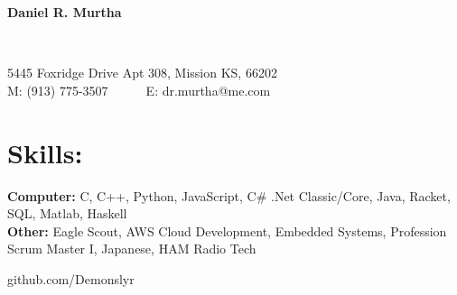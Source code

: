 \documentclass{res}
\begin{document}
\begin{resume}
\begin{changemargin}{-0.5in}{0in}
	\begin{center}
		\begin{Huge}
		\textbf{Daniel R. Murtha}
		\end{Huge}
	\\
		\begin{normalsize}
			5445 Foxridge Drive Apt 308, Mission KS, 66202\\
			M: (913) 775-3507~~~~~~E: dr.murtha@me.com
		\end{normalsize}
	\end{center}
\end{changemargin}\vspace{-5pt}
 \section{Skills:}\vspace{-10pt}
 \begin{minipage}{0.8\linewidth}
 	\begin{small}
 		\begin{flushleft}
 			{\bf Computer: }C, C++, Python, JavaScript, C\# .Net Classic/Core, Java, Racket, SQL, Matlab, Haskell\\
			{\bf Other: } Eagle Scout, AWS Cloud Development, Embedded Systems, Profession Scrum Master I, Japanese, HAM Radio Tech
 		\end{flushleft}
 	\end{small}   
 \end{minipage}
 \begin{minipage}{0.2\linewidth}
 	\begin{small}   
		\begin{flushright}
			github.com/Demonslyr\\
		\end{flushright}     
 	\end{small}   
 \end{minipage}\vspace{-10pt}
 

\end{resume}
\end{document}

